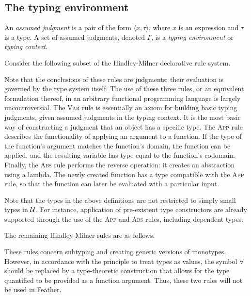 \documentclass[UKenglish, 11pt, a4paper, parskip=half]{scrbook}
\begin{document}
\subsection{The typing environment}

\begin{defn}
    An \textit{assumed judgment} is a pair of the form \( \langle x, \tau \rangle \), where \( x \) is an expression and \( \tau \) is a type.
    A set of assumed judgments, denoted \( \Gamma \), is a \textit{typing environment} or \textit{typing context}.
\end{defn}
Consider the following subset of the Hindley-Milner declarative rule system.
Note that the conclusions of these rules are judgments; their evaluation is governed by the type system itself.
The use of these three rules, or an equivalent formulation thereof, in an arbitrary functional programming language is largely uncontroversial.
The \textsc{Var} rule is essentially an axiom for building basic typing judgments, given assumed judgments in the typing context.
It is the most basic way of constructing a judgment that an object has a specific type.
The \textsc{App} rule describes the functionality of applying an argument to a function.
If the type of the function's argument matches the function's domain, the function can be applied, and the resulting variable has type equal to the function's codomain.
Finally, the \textsc{Abs} rule performs the reverse operation: it creates an abstraction using a lambda.
The newly created function has a type compatible with the \textsc{App} rule, so that the function can later be evaluated with a particular input.

Note that the types in the above definitions are not restricted to simply small types in \( \mathcal{U} \).
For instance, application of pre-existent type constructors are already supported through the use of the \textsc{App} and \textsc{Abs} rules, including dependent types.

The remaining Hindley-Milner rules are as follows.
These rules concern subtyping and creating generic versions of monotypes.
However, in accordance with the principle to treat types as values, the symbol \( \forall \) should be replaced by a type-theoretic construction that allows for the type quantified to be provided as a function argument.
Thus, these two rules will not be used in Feather.
\end{document}
